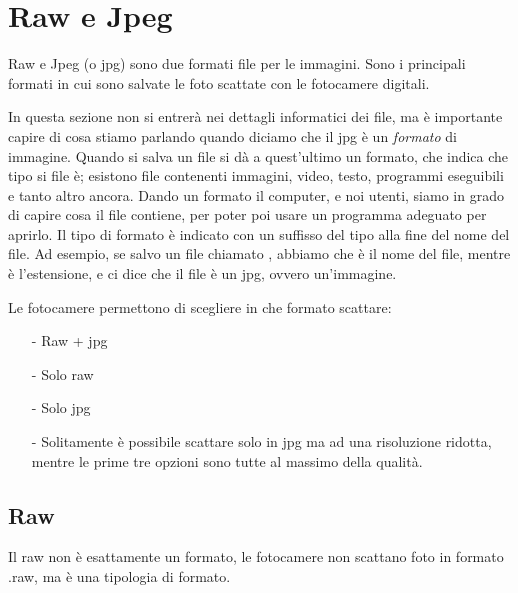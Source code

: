 \section{Raw e Jpeg} \label{sec:rawjpeg}

Raw e Jpeg (o jpg) sono due formati file per le immagini.
Sono i principali formati in cui sono salvate le foto scattate con le fotocamere digitali.

In questa sezione non si entrerà nei dettagli informatici dei file, ma è importante capire di cosa stiamo parlando quando diciamo che il jpg è un \textit{formato} di immagine.
Quando si salva un file si dà a quest'ultimo un formato, che indica che tipo si file è; esistono file contenenti immagini, video, testo, programmi eseguibili e tanto altro ancora.
Dando un formato il computer, e noi utenti, siamo in grado di capire cosa il file contiene, per poter poi usare un programma adeguato per aprirlo. Il tipo di formato è indicato con un suffisso del tipo  alla fine del nome del file.
Ad esempio, se salvo un file chiamato , abbiamo che  è il nome del file, mentre  è l'estensione, e ci dice che il file è un jpg, ovvero un'immagine.


Le fotocamere permettono di scegliere in che formato scattare:
\begin{itemize}
    \item[-] Raw + jpg
    \item[-] Solo raw
    \item[-] Solo jpg
    \item[-] Solitamente è possibile scattare solo in jpg ma ad una risoluzione ridotta, mentre le prime tre opzioni sono tutte al massimo della qualità.   
\end{itemize}


\subsection{Raw} \label{subsec:raw}
Il raw non è esattamente un formato, le fotocamere non scattano foto in formato .raw, ma è una tipologia di formato.

